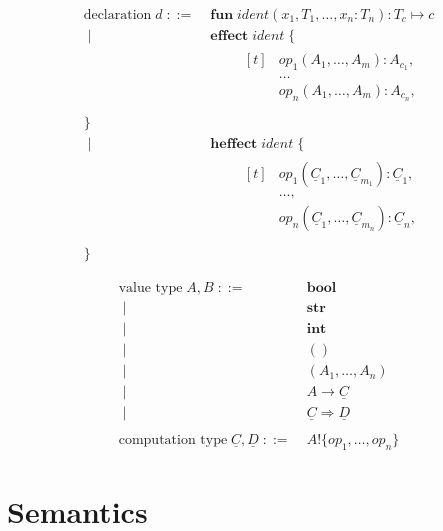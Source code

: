 \documentclass{article}
\newcommand\kw[1]{\mathbf{#1}}
\newcommand\IS{\mathbin{\;::=\;}}
\newcommand\OR{\mathbin{\;|\;}}
\newcommand\fun[2]{\kw{fun}\; #1 \mapsto #2}
\newcommand\Effect[2]{\kw{effect}\;#1\;\{\\&\qquad#2\\\}}
\newcommand\HEffect[2]{\kw{heffect}\;#1\;\{\\&\qquad#2\\\}}
\newcommand\comp[1]{\underline{#1}}
\begin{document}
\begin{align*}
    \text{declaration}\;d
        \IS & \fun{ident(x_1, T_1,\dots, x_n: T_n): T_c}{c} \\
        \OR & \Effect{ident}{
                \begin{aligned}[t]
                & op_1(A_1, \dots, A_m): A_{c_1},\\
                & \dots \\
                & op_n(A_1, \dots, A_m): A_{c_n},\\
                \end{aligned}
              }\\
        \OR & \HEffect{ident}{
                \begin{aligned}[t]
                & op_1(\comp{C}_1, \dots, \comp{C}_{m_1}): \comp{C}_1,\\
                & \dots, \\
                & op_n(\comp{C}_1, \dots, \comp{C}_{m_n}): \comp{C}_n,\\
                \end{aligned}
              }
\end{align*}

\begin{align*}
    \text{value type}\; A, B
        \IS & \kw{bool} \\
        \OR & \kw{str} \\
        \OR & \kw{int} \\
        \OR & () \\
        \OR & (A_1, \dots, A_n) \\
        \OR & A \to \comp{C} \\
        \OR & \comp{C} \Rightarrow \comp{D} \\
    \\
    \text{computation type}\; \comp{C}, \comp{D}
        \IS & A ! \{ op_1, \dots, op_n \}
\end{align*}

\newpage

\section{Semantics}
\end{document}
